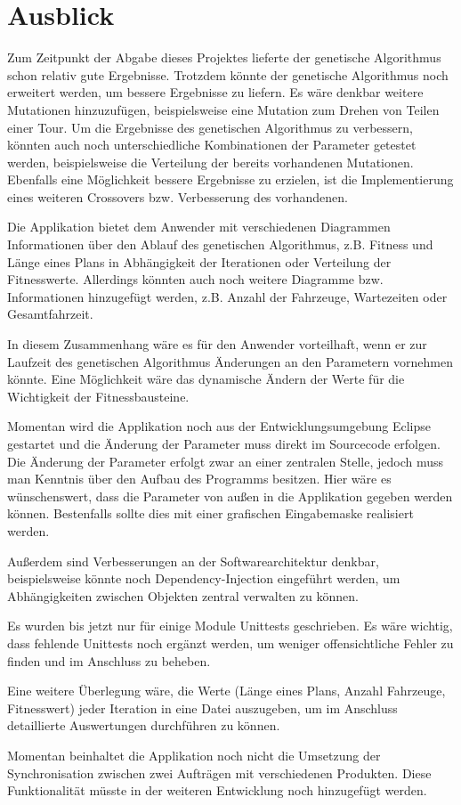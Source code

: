 \section{Ausblick}
Zum Zeitpunkt der Abgabe dieses Projektes lieferte der genetische Algorithmus schon relativ gute Ergebnisse. Trotzdem könnte der genetische Algorithmus noch erweitert werden, um bessere Ergebnisse zu liefern. Es wäre denkbar weitere Mutationen hinzuzufügen, beispielsweise eine Mutation zum Drehen von Teilen einer Tour. Um die Ergebnisse des genetischen Algorithmus zu verbessern, könnten auch noch unterschiedliche Kombinationen der Parameter getestet werden, beispielsweise die Verteilung der bereits vorhandenen Mutationen. Ebenfalls eine Möglichkeit bessere Ergebnisse zu erzielen, ist die Implementierung eines weiteren Crossovers bzw. Verbesserung des vorhandenen.

Die Applikation bietet dem Anwender mit verschiedenen Diagrammen Informationen über den Ablauf des genetischen Algorithmus, z.B. Fitness und Länge eines Plans in Abhängigkeit der Iterationen oder Verteilung der Fitnesswerte. Allerdings könnten auch noch weitere Diagramme bzw. Informationen hinzugefügt werden, z.B. Anzahl der Fahrzeuge, Wartezeiten oder Gesamtfahrzeit.

In diesem Zusammenhang wäre es für den Anwender vorteilhaft, wenn er zur Laufzeit des genetischen Algorithmus Änderungen an den Parametern vornehmen könnte. Eine Möglichkeit wäre das dynamische Ändern der Werte für die Wichtigkeit der Fitnessbausteine.

Momentan wird die Applikation noch aus der Entwicklungsumgebung Eclipse gestartet und die Änderung der Parameter muss direkt im Sourcecode erfolgen. Die Änderung der Parameter erfolgt zwar an einer zentralen Stelle, jedoch muss man Kenntnis über den Aufbau des Programms besitzen. Hier wäre es wünschenswert, dass die Parameter von außen in die Applikation gegeben werden können. Bestenfalls sollte dies mit einer grafischen Eingabemaske realisiert werden.

Außerdem sind Verbesserungen an der Softwarearchitektur denkbar, beispielsweise könnte noch Dependency-Injection eingeführt werden, um Abhängigkeiten zwischen Objekten zentral verwalten zu können.

Es wurden bis jetzt nur für einige Module Unittests geschrieben. Es wäre wichtig, dass fehlende Unittests noch ergänzt werden, um weniger offensichtliche Fehler zu finden und im Anschluss zu beheben.

Eine weitere Überlegung wäre, die Werte (Länge eines Plans, Anzahl Fahrzeuge, Fitnesswert) jeder Iteration in eine Datei auszugeben, um im Anschluss detaillierte Auswertungen durchführen zu können.

Momentan beinhaltet die Applikation noch nicht die Umsetzung der Synchronisation zwischen zwei Aufträgen mit verschiedenen Produkten. Diese Funktionalität müsste in der weiteren Entwicklung noch hinzugefügt werden.
